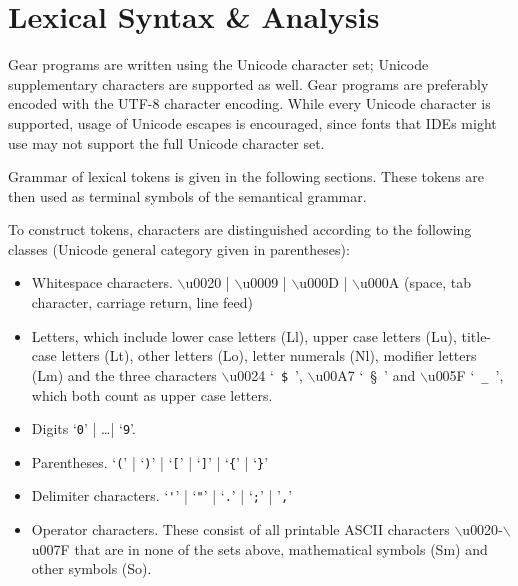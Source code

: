 
\newcommand{\Unicode}[1]{\mbox{$\backslash$u{#1}}}
\newcommand{\UnicodeRange}[2]{\mbox{$\backslash$u{#1}-$\backslash$u{#2}}}

\chapter{Lexical Syntax \& Analysis}

Gear programs are written using the Unicode character set; Unicode supplementary characters are supported as well. Gear programs are preferably encoded with the UTF-8 character encoding. While every Unicode character is supported, usage of Unicode escapes is encouraged, since fonts that IDEs might use may not support the full Unicode character set.

Grammar of lexical tokens is given in the following sections. These tokens are then used as terminal symbols of the semantical grammar. 

To construct tokens, characters are distinguished according to the following classes (Unicode general category given in parentheses):
\begin{itemize}
\item 
Whitespace characters. \Unicode{0020} | \Unicode{0009} | \Unicode{000D} | \Unicode{000A} (space, tab character, carriage return, line feed)

\item
Letters, which include lower case letters (Ll), upper case letters (Lu), title-case letters (Lt), other letters (Lo), letter numerals (Nl), modifier letters (Lm) and the three characters \Unicode{0024} `~\lstinline[mathescape=false]!$!~', \Unicode{00A7} `~§~' and \Unicode{005F} `~\lstinline!_!~', which both count as upper case letters. 

\item
Digits `\lstinline!0!' | \ldots \thinspace | `\lstinline!9!'. 

\item
Parentheses. `\lstinline!(!' | `\lstinline!)!' | `\lstinline![!' | `\lstinline!]!' | `\lstinline!{!' | `\lstinline!}!'

\item
Delimiter characters. `\lstinline!'!' | `\lstinline!"!' | `\lstinline!.!' | `\lstinline!;!' | '\lstinline!,!'

\item
Operator characters. These consist of all printable ASCII characters \UnicodeRange{0020}{007F} that are in none of the sets above, mathematical symbols (Sm) and other symbols (So). 
\end{itemize}

